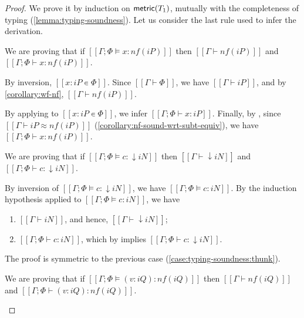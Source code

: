 \lemmaTypingSoundness*
\begin{proof}
    We prove it by induction on $\mathsf{metric}(T_1)$, mutually with 
    the completeness of typing (\cref{lemma:typing-soundness}).
    Let us consider the last rule used to infer the derivation.
    \begin{caseof}
        \item {}
            We are proving that if $[[Γ; Φ ⊨ x : nf(iP)]]$
            then $[[Γ ⊢ nf(iP)]]$ and $[[Γ; Φ ⊢ x : nf(iP)]]$.

            By inversion, $[[x : iP ∊ Φ]]$.
            Since $[[Γ ⊢ Φ]]$, we have $[[Γ ⊢ iP]]$,
            and by \cref{corollary:wf-nf}, $[[Γ ⊢ nf(iP)]]$.

            By applying 
            to $[[x : iP ∊ Φ]]$, we infer $[[Γ; Φ ⊢ x : iP]]$.
            Finally, by , 
            since $[[Γ ⊢ iP ≈ nf(iP)]]$ 
            (\cref{corollary:nf-sound-wrt-subt-equiv}),
            we have $[[Γ; Φ ⊢ x : nf(iP)]]$.

        \item {}
            \label{case:typing-soundness:thunk}

            We are proving that if $[[Γ; Φ ⊨ {c} : ↓iN]]$
            then $[[Γ ⊢ ↓iN]]$ and $[[Γ; Φ ⊢ {c} : ↓iN]]$.

            By inversion of $[[Γ; Φ ⊨ {c} : ↓iN]]$, 
            we have $[[Γ; Φ ⊨ c : iN]]$.
            By the induction hypothesis applied to $[[Γ; Φ ⊨ c : iN]]$,
            we have 
            \begin{enumerate}
                \item $[[Γ ⊢ iN]]$, and hence, $[[Γ ⊢ ↓iN]]$;
                \item $[[Γ; Φ ⊢ c : iN]]$, 
                    which by  implies
                    $[[Γ; Φ ⊢ {c} : ↓iN]]$.
            \end{enumerate}

        \item {}
            The proof is symmetric to the previous case
            (\cref{case:typing-soundness:thunk}).

        \item {}
            \label{case:typing-soundness:pos-annot}
            We are proving that if $[[Γ; Φ ⊨ (v : iQ) : nf(iQ)]]$
            then $[[Γ ⊢ nf(iQ)]]$ and $[[Γ; Φ ⊢ (v : iQ) : nf(iQ)]]$.


\end{caseof}
\end{proof}
